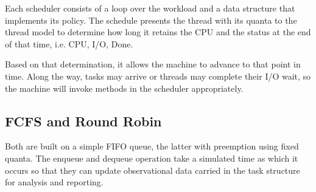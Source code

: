 \documentclass[11pt]{article}
\begin{document}
Each scheduler consists of a loop over the workload and a data structure
that implements its policy. The schedule presents the thread with its
quanta to the thread model to determine how long it retains the CPU and
the status at the end of that time, i.e. CPU, I/O, Done.

Based on that determination, it allows the machine to advance to that
point in time. Along the way, tasks may arrive or threads may complete
their I/O wait, so the machine will invoke methods in the scheduler
appropriately.

    \subsection{FCFS and Round Robin}\label{fcfs-and-round-robin}

Both are built on a simple FIFO queue, the latter with preemption using
fixed quanta. The enqueue and dequeue operation take a simulated time as
which it occurs so that they can update observational data carried in
the task structure for analysis and reporting.
\end{document}
